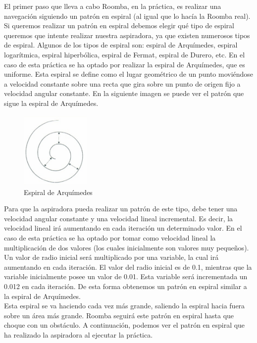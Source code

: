 El primer paso que lleva a cabo Roomba, en la práctica, es realizar una navegación siguiendo un patrón en espiral (al igual que lo hacía la Roomba real). Si queremos realizar un patrón en espiral debemos elegir qué tipo de espiral queremos que intente realizar nuestra aspiradora, ya que existen numerosos tipos de espiral. Algunos de los tipos de espiral son: espiral de Arquímedes, espiral logarítmica, espiral hiperbólica, espiral de Fermat, espiral de Durero, etc. En el caso de esta práctica se ha optado por realizar la espiral de Arquímedes, que es uniforme. Esta espiral se define como el lugar geométrico de un punto moviéndose a velocidad constante sobre una recta que gira sobre un punto de origen fijo a velocidad angular constante. En la siguiente imagen se puede ver el patrón que sigue la espiral de Arquímedes.\\

\begin{figure}[H]
  \begin{center}
    \includegraphics[width=0.3\textwidth]{figures/Vacuum/Espiral_Arquimedes.png}
		\caption{Espiral de Arquímedes}
		\label{fig.Espiral_Arquimedes}
		\end{center}
\end{figure}

Para que la aspiradora pueda realizar un patrón de este tipo, debe tener una velocidad angular constante y una velocidad lineal incremental. Es decir, la velocidad lineal irá aumentando en cada iteración un determinado valor. En el caso de esta práctica se ha optado por tomar como velocidad lineal la multiplicación de dos valores (los cuales inicialmente son valores muy pequeños). Un valor de radio inicial será multiplicado por una variable, la cual irá aumentando en cada iteración. El valor del radio inicial es de 0.1, mientras que la variable inicialmente posee un valor de 0.01. Esta variable será incrementada un 0.012 en cada iteración. De esta forma obtenemos un patrón en espiral similar a la espiral de Arquímedes.\\

Esta espiral se va haciendo cada vez más grande, saliendo la espiral hacia fuera sobre un área más grande. Roomba seguirá este patrón en espiral hasta que choque con un obstáculo. A continuación, podemos ver el patrón en espiral que ha realizado la aspiradora al ejecutar la práctica.\\

